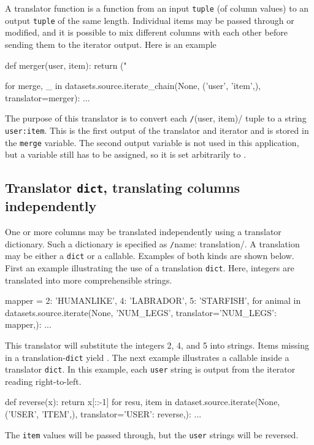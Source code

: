 A translator function is a function from an input \texttt{tuple} (of
column values) to an output \texttt{tuple} of the same length.
Individual items may be passed through or modified, and it is possible
to mix different columns with each other before sending them to the
iterator output.  Here is an example
\begin{python}
def merger(user, item):
    return ("%

for merge, _ in datasets.source.iterate_chain(None, ('user', 'item',),
                                              translator=merger):
    ...
\end{python}
The purpose of this translator is to convert each
\texttt/(user, item)/ tuple to a string \texttt{user:item}.  This is
the first output of the translator and iterator and is stored in the
\texttt{merge} variable.  The second output variable is not used in
this application, but a variable still has to be assigned, so it is
set arbitrarily to \pyNone.



\subsection*{Translator \texttt{dict}, translating columns independently}

One or more columns may be translated independently using a translator
dictionary.  Such a dictionary is specified
as \texttt/{name: translation}/.  A translation may be
either a \texttt{dict} or a callable.  Examples of both kinds are
shown below.  First an example illustrating the use of a
translation \texttt{dict}.  Here, integers are translated into more
comprehensible strings.
\begin{python}
mapper = {2: 'HUMANLIKE', 4: 'LABRADOR', 5: 'STARFISH',}
for animal in datasets.source.iterate(None, 'NUM_LEGS',
                                      translator={'NUM_LEGS': mapper,}):
    ...
\end{python}
This translator will substitute the integers 2, 4, and 5 into strings.
Items missing in a translation-\texttt{dict} yield \pyNone.  The next
example illustrates a callable inside a translator \texttt{dict}.  In
this example, each \texttt{user} string is output from the iterator
reading right-to-left.
\begin{python}
def reverse(x):
    return x[::-1]
for resu, item in dataset.source.iterate(None, ('USER', 'ITEM',),
                                         translator={'USER': reverse,}):
    ...
\end{python}
The \texttt{item} values will be passed through, but the \texttt{user}
strings will be reversed.



